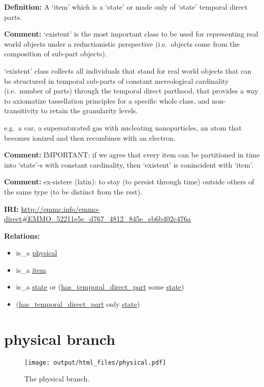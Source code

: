 \documentclass[a4paper,]{report}
\providecommand{\tightlist}{%
  \setlength{\itemsep}{0pt}\setlength{\parskip}{0pt}}
\begin{document}
\textbf{Definition:} A `item' which is a `state' or made only of `state'
temporal direct parts.

\textbf{Comment:} `existent' is the most important class to be used for
representing real world objects under a reductionistic perspective
(i.e.~objects come from the composition of sub-part objects).

`existent' class collects all individuals that stand for real world
objects that can be structured in temporal sub-parts of constant
mereological cardinality (i.e.~number of parts) through the temporal
direct parthood, that provides a way to axiomatize tassellation
principles for a specific whole class, and non-transitivity to retain
the granularity levels.

e.g.~a car, a supersaturated gas with nucleating nanoparticles, an atom
that becomes ionized and then recombines with an electron.

\textbf{Comment:} IMPORTANT: if we agree that every item can be
partitioned in time into `state'-s with constant cardinality, then
`existent' is conincident with `item'.

\textbf{Comment:} ex-sistere (latin): to stay (to persist through time)
outside others of the same type (to be distinct from the rest).

\textbf{IRI:}
\url{http://emmc.info/emmo-direct\#EMMO_52211e5e_d767_4812_845e_eb6b402c476a}

\textbf{Relations:}

\begin{itemize}
\tightlist
\item
  is\_a \protect\hyperlink{physical}{physical}
\item
  is\_a \protect\hyperlink{item}{item}
\item
  is\_a \protect\hyperlink{state}{state} or
  (\protect\hyperlink{has_temporal_direct_part}{has\_temporal\_direct\_part}
  some \protect\hyperlink{state}{state})
\item
  (\protect\hyperlink{has_temporal_direct_part}{has\_temporal\_direct\_part}
  only \protect\hyperlink{state}{state})
\end{itemize}

\hypertarget{physical-branch}{%
\section{physical branch}\label{physical-branch}}

\begin{figure}
\centering
\texttt{[image: output/html\_files/physical.pdf]}
\caption{The physical branch.}
\end{figure}
\end{document}
